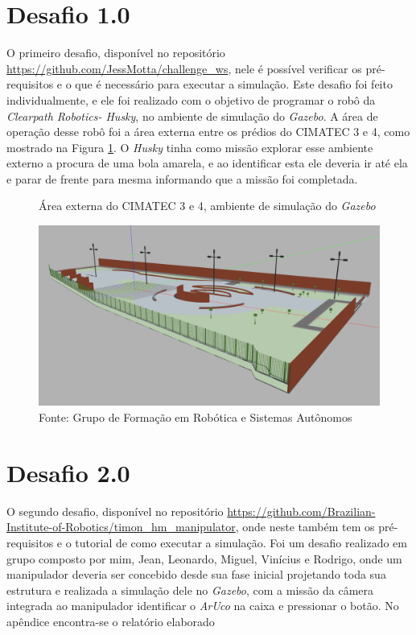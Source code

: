 \section{Desafio 1.0 }
\label{sec:desafio_1}
O primeiro desafio, disponível no repositório \url{https://github.com/JessMotta/challenge_ws}, nele é possível verificar os pré-requisitos e o que é necessário para executar a simulação. Este desafio foi feito individualmente, e ele foi realizado com o objetivo de programar o robô da \textit{Clearpath Robotics- Husky}, no ambiente de simulação do \textit{Gazebo}. A área de operação desse robô foi a área externa entre os prédios do CIMATEC 3 e 4, como mostrado na Figura \ref{fig:cimatec3_4}. O \textit{Husky} tinha como missão explorar esse ambiente externo a procura de uma bola amarela, e ao identificar esta ele deveria ir até ela e parar de frente para mesma informando que a missão foi completada.  


\begin{figure}[H]
    \caption{Área externa do CIMATEC 3 e 4, ambiente de simulação do \textit{Gazebo}}
    \centering
    \includegraphics[width= \textwidth]{Figures/cimatec4.png}
    \caption*{Fonte: Grupo de Formação em Robótica e Sistemas Autônomos}
    \label{fig:cimatec3_4}
\end{figure}



\section{Desafio 2.0 }
\label{sec:desafio_2}
O segundo desafio, disponível no repositório \url{https://github.com/Brazilian-Institute-of-Robotics/timon\_hm\_manipulator}, onde neste também tem os pré-requisitos e o tutorial de como executar a simulação. Foi um desafio realizado em grupo composto por mim, Jean, Leonardo, Miguel, Vinícius e Rodrigo, onde um manipulador deveria ser concebido desde sua fase inicial projetando toda sua estrutura e realizada a simulação dele no \textit{Gazebo}, com a missão da câmera integrada ao manipulador identificar o \textit{ArUco} na caixa e pressionar o botão. No apêndice encontra-se o relatório elaborado

